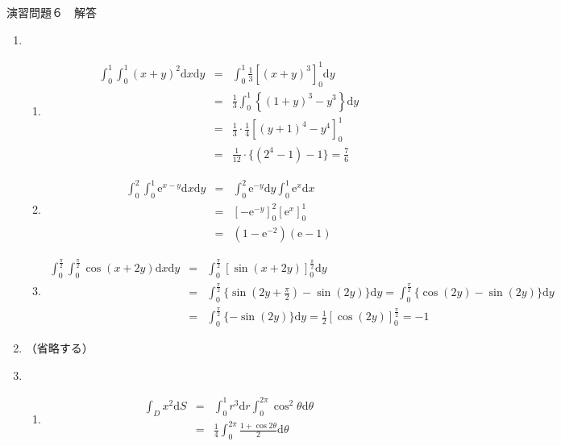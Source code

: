 \documentclass{jarticle}
\newcommand{\e}[1]{\tilde E^{({#1})}}
\def\d{\mathrm d}
\def\e{\mathrm{e}}
\begin{document}
\begin{center} {\Large 演習問題６　解答} \end{center}
  \begin{enumerate}
    \item
    \begin{enumerate}
      \item
        \begin{eqnarray*} 
          \int_0^1 \int_0^1 (x+y)^2 \d x \d y & = & \int_0^1 \frac{1}{3} \left[(x+y)^3 \right]_0^1 \d y \\
          & = & \frac{1}{3} \int_0^1 \left\{ (1+y)^3 - y^3 \right\} \d y \\
          & = & \frac{1}{3} \cdot \frac{1}{4} \left[ (y+1)^4 - y^4 \right]_0^1 \\
          & = & \frac{1}{12} \cdot \{ (2^4-1)-1 \} = \frac{7}{6}
        \end{eqnarray*}
      \item
        \begin{eqnarray*}
          \int_0^2 \int_0^1 \e^{x-y} \d x \d y & = & \int_0^2 \e^{-y} \d y \int_0^1 \e^{x} \d x \\
          & = & \left[ - \e^{-y} \right]_0^2 \left[ \e^{x} \right]_0^1 \\
          & = & (1 - \e^{-2} )(\e -1 )
        \end{eqnarray*}
      \item
        \begin{eqnarray*}
          \int_0^{\frac{\pi}{2}} \int_0^{\frac{\pi}{2}} \cos(x+2y) \d x \d y & = & \int_0^{\frac{\pi}{2}} \left[ \sin(x+2y) \right]_0^{\frac{\pi}{2}} \d y \\
          & = & \int_0^{\frac{\pi}{2}} \{ \sin(2y+\frac{\pi}{2}) - \sin(2y) \} \d y =  \int_0^{\frac{\pi}{2}} \{ \cos(2y) - \sin(2y) \} \d y \\
          & = & \int_0^{\frac{\pi}{2}} \{ - \sin(2y) \} \d y = \frac{1}{2} \left[ \cos(2y) \right]_0^{\frac{\pi}{2}} = -1
        \end{eqnarray*}
    \end{enumerate}
    \item （省略する）
    \item
      \begin{enumerate}
        \item
          \begin{eqnarray*}
            \int_{D} x^2 \d S & = & \int_0^1 r^3 \d r \int_0^{2\pi} \cos^2 \theta \d \theta \\
            & = & \frac{1}{4} \int_0^{2\pi} \frac{1+\cos{2\theta}}{2} \d \theta \\

\end{eqnarray*}
\end{enumerate}
\end{enumerate}
\end{document}
